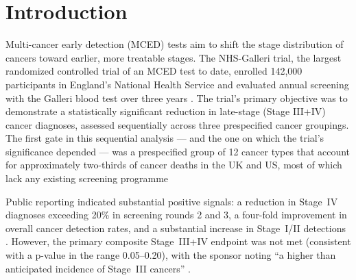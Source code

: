 \documentclass[11pt,letter]{article}
\begin{document}
\begin{abstract}
\noindent\textbf{Interpretation:}
Stage slip provides a quantitatively sufficient and mechanistically
transparent explanation for the primary endpoint miss. The test's biological
performance is intact: it detects cancers earlier and reduces Stage~IV
diagnoses. The composite endpoint was attenuated by systemic diagnostic
latency in the NHS, not by a failure of the assay. Future MCED trials should
consider endpoints less vulnerable to infrastructure delays or incorporate
prespecified adjustments for expected diagnostic pathway timing.

\noindent\textbf{Funding:} None. \hfill \textbf{Registration:} Not applicable.
\end{abstract}

\newpage
\tableofcontents
\newpage

\section{Introduction}

Multi-cancer early detection (MCED) tests aim to shift the stage
distribution of cancers toward earlier, more treatable stages. The
NHS-Galleri trial, the largest randomized controlled trial of an MCED test
to date, enrolled 142,000 participants in England's National Health Service
and evaluated annual screening with the Galleri blood test over three years
\cite{GRAIL2026}.  
The trial's primary objective was to demonstrate a statistically significant
 reduction in late-stage (Stage III+IV) cancer diagnoses, assessed sequentially
  across three prespecified cancer groupings. The first gate in this sequential
   analysis — and the one on which the trial's significance depended — was
    a prespecified group of 12 cancer types that account for approximately
     two-thirds of cancer deaths in the UK and US, most of which lack any
      existing screening programme

Public reporting indicated substantial positive signals: a reduction in
Stage~IV diagnoses exceeding 20\% in screening rounds 2 and 3, a four-fold
improvement in overall cancer detection rates, and a substantial increase
in Stage~I/II detections \cite{GRAIL2026}. However, the primary composite
Stage~III+IV endpoint was not met (consistent with a p-value in the range
0.05--0.20), with the sponsor noting ``a higher than anticipated incidence
of Stage~III cancers'' \cite{GRAIL2026}.
\end{document}
